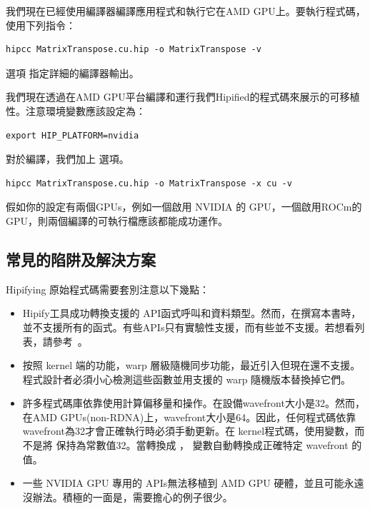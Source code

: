 我們現在已經使用編譯器編譯應用程式和執行它在AMD GPU上。要執行程式碼，使用下列指令：

\begin{lstlisting}
hipcc MatrixTranspose.cu.hip -o MatrixTranspose -v
\end{lstlisting}

選項  指定詳細的編譯器輸出。

我們現在透過在AMD GPU平台編譯和運行我們Hipified的程式碼來展示的可移植性。注意環境變數應該設定為：

\begin{lstlisting}
export HIP_PLATFORM=nvidia
\end{lstlisting}

對於編譯，我們加上  選項。

\begin{lstlisting}
hipcc MatrixTranspose.cu.hip -o MatrixTranspose -x cu -v
\end{lstlisting}

假如你的設定有兩個GPUs，例如一個啟用 NVIDIA 的 GPU，一個啟用ROCm的GPU，則兩個編譯的可執行檔應該都能成功運作。

\subsection{常見的陷阱及解決方案}

Hipifying 原始程式碼需要套別注意以下幾點：

\begin{itemize}
    \item  Hipify工具成功轉換支援的 API函式呼叫和資料類型。然而，在撰寫本書時，並不支援所有的函式。有些APIs只有實驗性支援，而有些並不支援。若想看列表，請參考~\cite{HIP-Supported-API}。
    \item 按照 kernel 端的功能，warp 層級隨機同步功能，最近引入但現在還不支援。程式設計者必須小心檢測這些函數並用支援的 warp 隨機版本替換掉它們。
    \item 許多程式碼庫依靠使用計算偏移量和操作。在設備wavefront大小是32。然而，在AMD GPUs(non-RDNA)上，wavefront大小是64。因此，任何程式碼依靠wavefront為32才會正確執行時必須手動更新。在 kernel程式碼，使用變數，而不是將  保持為常數值32。當轉換成 ， 變數自動轉換成正確特定 wavefront 的值。
    \item 一些 NVIDIA GPU 專用的 APIs無法移植到 AMD GPU 硬體，並且可能永遠沒辦法。積極的一面是，需要擔心的例子很少。
\end{itemize}

